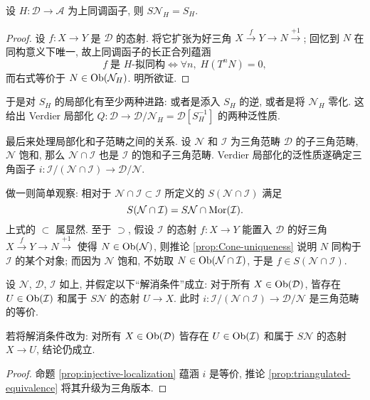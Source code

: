 \begin{proposition}\label{prop:cohomological-functor-multiplicative}
	设 $H: \mathcal{D} \to \mathcal{A}$ 为上同调函子, 则 $S\mathcal{N}_H = S_H$.
\end{proposition}
\begin{proof}
	设 $f: X \to Y$ 是 $\mathcal{D}$ 的态射. 将它扩张为好三角 $X \xrightarrow{f} Y \to N \xrightarrow{+1}$; 回忆到 $N$ 在同构意义下唯一, 故上同调函子的长正合列蕴涵
	\[ f \;\text{是 $H$-拟同构} \iff \forall n, \; H(T^n N) = 0, \]
	而右式等价于 $N \in \operatorname{Ob}(\mathcal{N}_H)$. 明所欲证.
\end{proof}

于是对 $S_H$ 的局部化有至少两种进路: 或者是添入 $S_H$ 的逆, 或者是将 $\mathcal{N}_H$ 零化.	这给出 Verdier 局部化 $Q: \mathcal{D} \to \mathcal{D}/\mathcal{N}_H = \mathcal{D}[S_H^{-1}]$ 的两种泛性质.

最后来处理局部化和子范畴之间的关系. 设 $\mathcal{N}$ 和 $\mathcal{I}$ 为三角范畴 $\mathcal{D}$ 的子三角范畴, $\mathcal{N}$ 饱和, 那么 $\mathcal{N} \cap \mathcal{I}$ 也是 $\mathcal{I}$ 的饱和子三角范畴. Verdier 局部化的泛性质遂确定三角函子 $i: \mathcal{I}/(\mathcal{N} \cap \mathcal{I}) \to \mathcal{D}/\mathcal{N}$.

做一则简单观察: 相对于 $\mathcal{N} \cap \mathcal{I} \subset \mathcal{I}$ 所定义的 $S(\mathcal{N} \cap \mathcal{I})$ 满足
\begin{equation}\label{eqn:S-N-D}
	S(\mathcal{N} \cap \mathcal{I}) = S\mathcal{N} \cap \operatorname{Mor}(\mathcal{I}).
\end{equation}
上式的 $\subset$ 属显然. 至于 $\supset$, 假设 $\mathcal{I}$ 的态射 $f: X \to Y$ 能置入 $\mathcal{D}$ 的好三角 $X \xrightarrow{f} Y \to N \xrightarrow{+1}$ 使得 $N \in \operatorname{Ob}(\mathcal{N})$, 则推论 \ref{prop:Cone-uniqueness} 说明 $N$ 同构于 $\mathcal{I}$ 的某个对象; 而因为 $\mathcal{N}$ 饱和, 不妨取 $N \in \operatorname{Ob}(\mathcal{N} \cap \mathcal{I})$, 于是 $f \in S(\mathcal{N} \cap \mathcal{I})$.

\begin{proposition}\label{prop:triangulated-i-equiv}
	设 $\mathcal{N}$, $\mathcal{D}$, $\mathcal{I}$ 如上, 并假定以下``解消条件''成立: 对于所有 $X \in \operatorname{Ob}(\mathcal{D})$, 皆存在 $U \in \operatorname{Ob}(\mathcal{I})$ 和属于 $S\mathcal{N}$ 的态射 $U \to X$. 此时 $i: \mathcal{I}/(\mathcal{N} \cap \mathcal{I}) \to \mathcal{D}/\mathcal{N}$ 是三角范畴的等价.
	
	若将解消条件改为: 对所有 $X \in \operatorname{Ob}(\mathcal{D})$ 皆存在 $U \in \operatorname{Ob}(\mathcal{I})$ 和属于 $S\mathcal{N}$ 的态射 $X \to U$, 结论仍成立.
\end{proposition}
\begin{proof}
	命题 \ref{prop:injective-localization} 蕴涵 $i$ 是等价, 推论 \ref{prop:triangulated-equivalence} 将其升级为三角版本. 
\end{proof}

